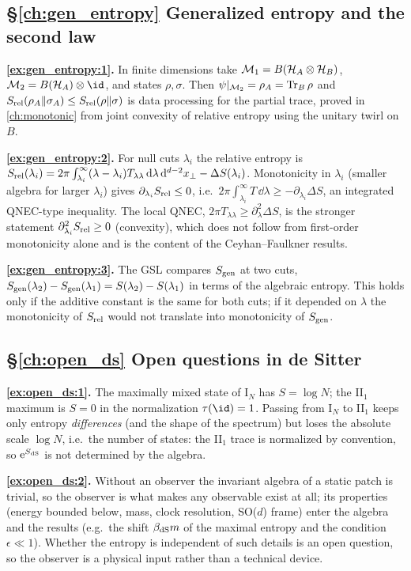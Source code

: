 {\subsection*{\S\ref{ch:gen_entropy} Generalized entropy and the second law}
\textbf{\ref{ex:gen_entropy:1}.} In finite dimensions take $\mathcal{M}_1=B(\mathcal{H}_A\otimes\mathcal{H}_B)$, $\M_2=B(\HH_A)\otimes\id$, and states $\rho,\sigma$. Then $\psi|_{\mathcal{M}_2}=\rho_A=\operatorname{Tr}_B\rho$ and $S_{\rm rel}(\rho_A\|\sigma_A)\le S_{\rm rel}(\rho\|\sigma)$ is data processing for the partial trace, proved in \cref{ch:monotonic} from joint convexity of relative entropy using the unitary twirl on $B$.\par
\textbf{\ref{ex:gen_entropy:2}.} For null cuts $\lambda_i$ the relative entropy is $S_{\rm rel}(\lambda_i)=2\pi\int_{\lambda_i}^\infty(\lambda-\lambda_i)T_{\lambda\lambda}\,\mathrm{d}\lambda\,\mathrm{d}^{d-2}x_\perp-\Delta S(\lambda_i)$. Monotonicity in $\lambda_i$ (smaller algebra for larger $\lambda_i$) gives $\partial_{\lambda_i}S_{\rm rel}\le0$, i.e.\ $2\pi\int_{\lambda_i}^\infty T\,\dd\lambda\ge-\partial_{\lambda_i}\Delta S$, an integrated QNEC-type inequality. The local QNEC, $2\pi T_{\lambda\lambda}\ge\partial_\lambda^2\Delta S$, is the stronger statement $\partial_{\lambda_i}^2S_{\rm rel}\ge0$ (convexity), which does not follow from first-order monotonicity alone and is the content of the Ceyhan--Faulkner results.\par
\textbf{\ref{ex:gen_entropy:3}.} The GSL compares $S_{\mathrm{gen}}$ at two cuts, $S_{\mathrm{gen}}(\lambda_2)-S_{\mathrm{gen}}(\lambda_1)=S(\lambda_2)-S(\lambda_1)$ in terms of the algebraic entropy. This holds only if the additive constant is the same for both cuts; if it depended on $\lambda$ the monotonicity of $S_{\rm rel}$ would not translate into monotonicity of $S_{\mathrm{gen}}$.\par

\subsection*{\S\ref{ch:open_ds} Open questions in de Sitter}
\textbf{\ref{ex:open_ds:1}.} The maximally mixed state of I$_N$ has $S=\log N$; the II$_1$ maximum is $S=0$ in the normalization $\tau(\id)=1$. Passing from I$_N$ to II$_1$ keeps only entropy \emph{differences} (and the shape of the spectrum) but loses the absolute scale $\log N$, i.e.\ the number of states: the II$_1$ trace is normalized by convention, so $\mathrm{e}^{S_{\rm dS}}$ is not determined by the algebra.\par
\textbf{\ref{ex:open_ds:2}.} Without an observer the invariant algebra of a static patch is trivial, so the observer is what makes any observable exist at all; its properties (energy bounded below, mass, clock resolution, SO($d$) frame) enter the algebra and the results (e.g.\ the shift $\beta_{\rm dS}m$ of the maximal entropy and the condition $\epsilon\ll1$). Whether the entropy is independent of such details is an open question, so the observer is a physical input rather than a technical device.\par

}
